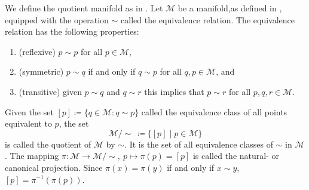 \begin{definition}\label{def:quotient_manifold}
    We define the quotient manifold as in \cite[p.~27]{AbsilMahonySepulchre2008}. Let $\mathcal{M}$ be a manifold,as defined in \cite[p.~20]{AbsilMahonySepulchre2008}, equipped with the operation $\sim$ called the \textup{equivalence relation}. The equivalence relation has the following properties:
    \begin{enumerate}
        \item (reflexive) $p\sim p$ for all $p\in \mathcal{M}$,
        \item (symmetric) $p \sim q$ if and only if $q\sim p$ for all $q,p\in \mathcal{M}$, and
        \item (transitive) given $p\sim q$ and $q\sim r$ this implies that $p\sim r$ for all $p,q,r\in \mathcal{M}$.
    \end{enumerate}
    Given the set $[p]\coloneqq \{q\in \mathcal{M}\colon q\sim p\}$ called the \textup{equivalence class} of all points equivalent to $p$, the set
    \begin{equation*}
        \mathcal{M}/\sim~ \coloneqq \{[p] \;|\; p\in \mathcal{M}\}
    \end{equation*}
    is called the \textup{quotient of }$\mathcal{M}$\textup{ by }$\sim$. It is the set of all equivalence classes of $\sim$ in $\mathcal{M}$. The mapping $\pi\colon \mathcal{M}\xrightarrow{}\mathcal{M}/\sim,~p\mapsto\pi(p)=[p]$ is called the \textup{natural-} or \textup{canonical projection}. Since $\pi(x)=\pi(y)$ if and only if $x\sim y$, $[p]=\pi^{-1}(\pi(p))$. 
\end{definition}

